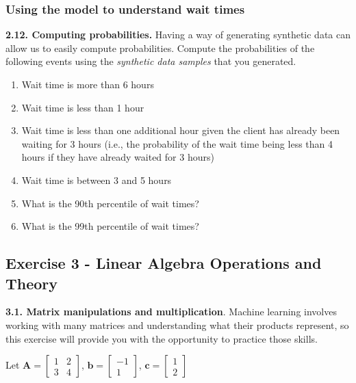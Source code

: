 \documentclass[
  letterpaper,
  DIV=11,
  numbers=noendperiod]{scrartcl}
\providecommand{\tightlist}{%
  \setlength{\itemsep}{0pt}\setlength{\parskip}{0pt}}\usepackage{longtable,booktabs,array}
\begin{document}
\subsubsection{Using the model to understand wait
times}\label{using-the-model-to-understand-wait-times}

\textbf{2.12. Computing probabilities.} Having a way of generating
synthetic data can allow us to easily compute probabilities. Compute the
probabilities of the following events using the \emph{synthetic data
samples} that you generated.

\begin{enumerate}
\def\labelenumi{\arabic{enumi}.}
\tightlist
\item
  Wait time is more than 6 hours
\item
  Wait time is less than 1 hour
\item
  Wait time is less than one additional hour given the client has
  already been waiting for 3 hours (i.e., the probability of the wait
  time being less than 4 hours if they have already waited for 3 hours)
\item
  Wait time is between 3 and 5 hours
\item
  What is the 90th percentile of wait times?
\item
  What is the 99th percentile of wait times?
\end{enumerate}

\newpage{}

\subsection{Exercise 3 - Linear Algebra Operations and
Theory}\label{exercise-3---linear-algebra-operations-and-theory}

\textbf{3.1. Matrix manipulations and multiplication}. Machine learning
involves working with many matrices and understanding what their
products represent, so this exercise will provide you with the
opportunity to practice those skills.

Let \(\mathbf{A} =  \begin{bmatrix}
1 & 2 \\
3 & 4
\end{bmatrix}\), \(\mathbf{b} =  \begin{bmatrix}
-1  \\
1
\end{bmatrix}\), \(\mathbf{c} =  \begin{bmatrix}
1  \\
2
\end{bmatrix}\)
\end{document}
